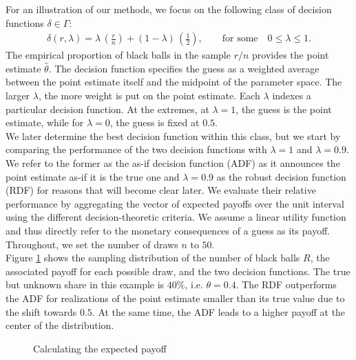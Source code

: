 For an illustration of our methods, we focus on the following class of decision functions $\delta \in \Gamma$:
%
\begin{align*}
 \delta(r, \lambda) = \lambda\,\left(\frac{r}{n}\right)  + (1 - \lambda)\,\left(\frac{1}{2}\right),\qquad\text{for some}\quad 0 \leq \lambda \leq 1.
\end{align*}
%
The empirical proportion of black balls in the sample $r / n$ provides the point estimate $\hat{\theta}$. The decision function specifies the guess as a weighted average between the point estimate itself and the midpoint of the parameter space. The larger $\lambda$, the more weight is put on the point estimate. Each $\lambda$ indexes a particular decision function. At the extremes, at $\lambda = 1$, the guess is the point estimate, while for $\lambda = 0$, the guess is fixed at $0.5$.\\

We later determine the best decision function within this class, but we start by comparing the performance of the two decision functions with $\lambda = 1$ and $\lambda = 0.9$. We refer to the former as the as-if decision function (ADF) as it announces the point estimate as-if it is the true one and $\lambda=0.9$ as the robust decision function (RDF) for reasons that will become clear later. We evaluate their relative performance by aggregating the vector of expected payoffs over the unit interval using the different decision-theoretic criteria. We assume a linear utility function and thus directly refer to the monetary consequences of a guess as its payoff. Throughout, we set the number of draws $n$ to  $50$.\\

Figure \ref{Calculation of expected payoff} shows the sampling distribution of the number of black balls $R$, the associated payoff for each possible draw, and the two decision functions. The true but unknown share in this example is $40\%$, i.e. $\theta = 0.4$. The RDF outperforms the ADF for realizations of the point estimate smaller than its true value due to the shift towards $0.5$. At the same time, the ADF leads to a higher payoff at the center of the distribution.\\

\begin{figure}[h!]\centering
{}
\caption{Calculating the expected payoff}\label{Calculation of expected payoff}
\end{figure}\FloatBarrier

